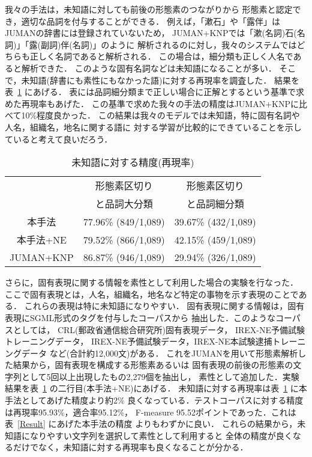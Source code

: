 我々の手法は，未知語に対しても前後の形態素のつながりから
形態素と認定でき，適切な品詞を付与することができる．
例えば，「漱石」や「露伴」はJUMANの辞書には登録されていないため，
JUMAN+KNPでは「漱(名詞)石(名詞)」「露(副詞)伴(名詞)」のように
解析されるのに対し，我々のシステムではどちらも正しく名詞であると解析される．
この場合は，細分類も正しく人名であると解析できた．
このような固有名詞などは未知語になることが多い．
そこで，未知語(辞書にも素性にもなかった語)に対する再現率を調査した．
結果を表~\ref{Result2} にあげる．
表には品詞細分類まで正しい場合に正解とするという基準で求めた再現率もあげた．
この基準で求めた我々の手法の精度はJUMAN+KNPに比べて10\%程度良かった．
この結果は我々のモデルでは未知語，特に固有名詞や人名，組織名，地名に関する語に
対する学習が比較的にできていることを示していると考えて良いだろう．

\begin{table}[htbp]
  \small
  \begin{center}
    \caption{未知語に対する精度(再現率)}
    \label{Result2} 
    \begin{tabular}{|c|c|c|}
      \hline
      & 形態素区切り & 形態素区切り\\
      & と品詞大分類 & と品詞細分類\\
      \hline      
      本手法 & 77.96\% (849/1,089) & 39.67\% (432/1,089)\\
      本手法+NE & 79.52\% (866/1,089) & 42.15\% (459/1,089)\\
      JUMAN+KNP & 86.87\% (946/1,089) & 29.94\% (326/1,089)\\
      \hline
    \end{tabular}
  \end{center}
\end{table}

さらに，固有表現に関する情報を素性として利用した場合の実験を行なった．
ここで固有表現とは，人名，組織名，地名など特定の事物を示す表現のことである．
これらの表現は特に未知語になりやすい．
固有表現に関する情報は，固有表現にSGML形式のタグを付与したコーパスから
抽出した．このようなコーパスとしては，
CRL(郵政省通信総合研究所)固有表現データ，
IREX-NE予備試験トレーニングデータ，
IREX-NE予備試験データ，IREX-NE本試験逮捕トレーニングデータ
など(合計約12,000文)\cite{Uchimoto:jnlp2000a}がある．
これをJUMANを用いて形態素解析した結果から，固有表現を構成する形態素あるいは
固有表現の前後の形態素の文字列として5回以上出現したもの2,279個を抽出し，
素性として追加した．実験結果を表~\ref{Result2} の二行目(本手法+NE)にあげる．
未知語に対する再現率は表~\ref{Result2} に本手法としてあげた精度より約2\%
良くなっている．テストコーパスに対する精度は再現率95.93\%，適合率95.12\%，
F-measure 95.52ポイントであった．これは表~\ref{Result} にあげた本手法の精度
よりもわずかに良い．
これらの結果から，未知語になりやすい文字列を選択して素性として利用すると
全体の精度が良くなるだけでなく，未知語に対する再現率も良くなることが分かる．

